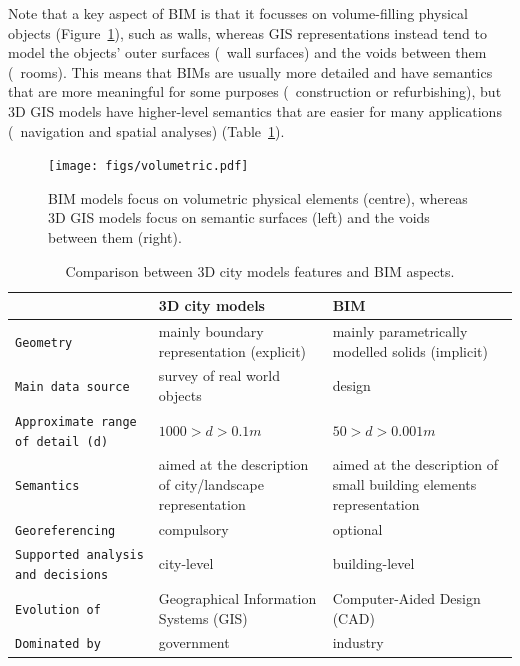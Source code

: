 Note that a key aspect of BIM is that it focusses on volume-filling physical objects (Figure~\ref{fig:volumetric}), such as walls, whereas GIS representations instead tend to model the objects' outer surfaces (\eg\ wall surfaces) and the voids between them (\eg\ rooms).
This means that BIMs are usually more detailed and have semantics that are more meaningful for some purposes (\eg\ construction or refurbishing), but 3D GIS models have higher-level semantics that are easier for many applications (\eg\  navigation and spatial analyses) (Table~\ref{tab:vs}).

\begin{figure}
\centering
\texttt{[image: figs/volumetric.pdf]}
\caption{BIM models focus on volumetric physical elements (centre), whereas 3D GIS models focus on semantic surfaces (left) and the voids between them (right).}%
\label{fig:volumetric}
\end{figure}


\begin{table}
	\centering
	\small
	\begin{tabular}{|m{2.3cm}|m{3.5cm}|m{3.5cm}|}
		\hline
		& \textbf{3D city models} & \textbf{BIM}  \\ \hline
		\texttt{Geometry} & mainly boundary representation (explicit) & mainly parametrically modelled solids (implicit) \\ \hline
		\texttt{Main data source }& survey of real world objects & design \\ \hline
		\texttt{Approximate range of detail (d)} & $1000>d>0.1 m$ & $50>d>0.001 m$ \\ \hline
		\texttt{Semantics} & aimed at the description of city/landscape representation & aimed at the description of small building elements representation  \\ \hline
		\texttt{Georeferencing} & compulsory & optional  \\ \hline
		\texttt{Supported analysis and decisions} & city-level & building-level \\ \hline
		\texttt{Evolution of} & Geographical Information Systems (GIS) & Computer-Aided Design (CAD) \\ \hline
		\texttt{Dominated by} & government & industry \\ \hline
	\end{tabular}
	\caption{Comparison between 3D city models features and BIM aspects.}%
	\label{tab:vs}
\end{table}



